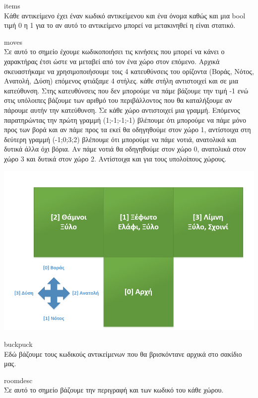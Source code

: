 \noindent
items\\
Κάθε αντικείμενο έχει έναν κωδικό αντικείμενου και ένα όνομα καθώς και μια bool τιμή 0 η 1 για το αν αυτό το αντικείμενο μπορεί να μετακινηθεί η είναι στατικό.

\noindent
moves\\
Σε αυτό το σημείο έχουμε κωδικοποιήσει τις κινήσεις που μπορεί να κάνει
ο χαρακτήρας έτσι ώστε να μεταβεί από τον ένα χώρο στον επόμενο. Αρχικά 
σκευαστήκαμε να χρησιμοποιήσουμε τοις 4 κατευθύνσεις του ορίζοντα (Βοράς, Νότος, Ανατολή, Δύση) επόμενος φτιάξαμε 4 στήλες. κάθε στήλη αντιστοιχεί και σε μια κατεύθυνση. Στης κατευθύνσεις που δεν μπορούμε να πάμε βάζουμε την τιμή -1 ενώ στις υπόλοιπες βάζουμε των αριθμό του περιβάλλοντος που θα καταλήξουμε αν πάρουμε αυτήν την κατεύθυνση. Σε κάθε χώρο αντιστοιχεί μια γραμμή. Επόμενος παρατηρώντας την πρώτη γραμμή (1;-1;-1;-1) βλέπουμε ότι μπορούμε να πάμε μόνο προς των βορά και αν πάμε προς τα εκεί θα οδηγηθούμε
στον χώρο 1, αντίστοιχα στη δεύτερη γραμμή (-1;0;3;2) βλέπουμε ότι μπορούμε 
να πάμε νοτιά, ανατολικά και δυτικά άλλα όχι βόρια. Αν πάμε νοτιά θα οδηγηθούμε στον χώρο 0, ανατολικά στον χώρο 3 και δυτικά στον χώρο 2. Αντίστοιχα και για τους υπολοίπους χώρους.

\begin{center}
			\includegraphics[width=1\textwidth]{image/1.4.PNG}		
\end{center}

\noindent
buckpuck\\
Εδώ βάζουμε τους κωδικούς αντικείμενων που θα βρισκόντανε αρχικά στο σακίδιο μας.

\noindent 
roomdesc\\
Σε αυτό το σημείο βάζουμε την περιγραφή και των κωδικό του κάθε χώρου.

